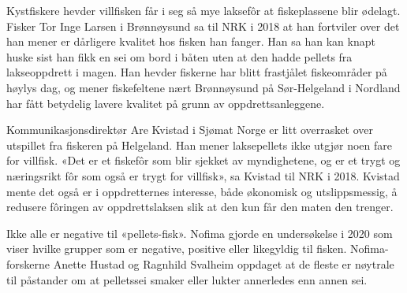 Kystfiskere hevder villfisken får i seg så mye laksefôr at fiskeplassene blir ødelagt. Fisker Tor Inge Larsen i Brønnøysund sa til NRK i 2018 at han fortviler over det han mener er dårligere kvalitet hos fisken han fanger. Han sa han kan knapt huske sist han fikk en sei om bord i båten uten at den hadde pellets fra lakseoppdrett i magen. Han hevder fiskerne har blitt frastjålet fiskeområder på høylys dag, og mener fiskefeltene nært Brønnøysund på Sør-Helgeland i Nordland har fått betydelig lavere kvalitet på grunn av oppdrettsanleggene. \cite{Olsen m.fl. 2018}

Kommunikasjonsdirektør Are Kvistad i Sjømat Norge er litt overrasket over utspillet fra fiskeren på Helgeland. Han mener laksepellets ikke utgjør noen fare for villfisk. «Det er et fiskefôr som blir sjekket av myndighetene, og er et trygt og næringsrikt fôr som også er trygt for villfisk», sa Kvistad til NRK i 2018. Kvistad mente det også er i oppdretternes interesse, både økonomisk og utslippsmessig, å redusere fôringen av oppdrettslaksen slik at den kun får den maten den trenger. \cite{Olsen m.fl. 2018}


Ikke alle er negative til «pellets-fisk». Nofima gjorde en undersøkelse i 2020 som viser hvilke grupper som er negative, positive eller likegyldig til fisken. Nofima-forskerne Anette Hustad og Ragnhild Svalheim oppdaget at de fleste er nøytrale til påstander om at pelletssei smaker eller lukter annerledes enn annen sei. \cite{Hustad og Svalheim 2020}

